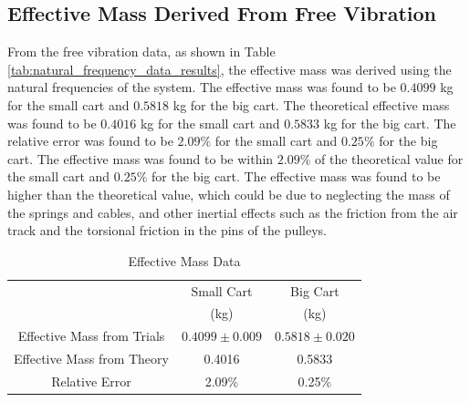 \subsection{Effective Mass Derived From Free Vibration}
From the free vibration data, as shown in Table \ref{tab:natural_frequency_data_results}, the effective mass was derived using the natural frequencies of the system. The effective mass was found to be $0.4099$ kg for the small cart and $0.5818$ kg for the big cart. The theoretical effective mass was found to be $0.4016$ kg for the small cart and $0.5833$ kg for the big cart. The relative error was found to be $2.09\%$ for the small cart and $0.25\%$ for the big cart. The effective mass was found to be within $2.09\%$ of the theoretical value for the small cart and $0.25\%$ for the big cart. The effective mass was found to be higher than the theoretical value, which could be due to neglecting the mass of the springs and cables, and other inertial effects such as the friction from the air track and the torsional friction in the pins of the pulleys.
\begin{table}[H]
    \centering
    \caption{Effective Mass Data}
    \label{tab:effective_mass_data_for_effective_mass_results}
    \begin{tabular}{ccc}
    \toprule
        & Small Cart & Big Cart \\
        & (kg) & (kg) \\
        \midrule
        Effective Mass from Trials & $0.4099 \pm 0.009$ & $0.5818 \pm 0.020$ \\
        Effective Mass from Theory & 0.4016 & 0.5833 \\
        \midrule 
        Relative Error & 2.09\% & 0.25\% \\
        \bottomrule
    \end{tabular}
\end{table}